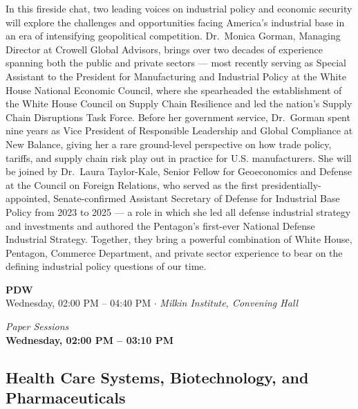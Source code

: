 \documentclass[
  10pt,
  letterpaper,
  DIV=11,
  numbers=noendperiod]{scrartcl}
\begin{document}
In this fireside chat, two leading voices on industrial policy and
economic security will explore the challenges and opportunities facing
America's industrial base in an era of intensifying geopolitical
competition. Dr.~Monica Gorman, Managing Director at Crowell Global
Advisors, brings over two decades of experience spanning both the public
and private sectors --- most recently serving as Special Assistant to
the President for Manufacturing and Industrial Policy at the White House
National Economic Council, where she spearheaded the establishment of
the White House Council on Supply Chain Resilience and led the nation's
Supply Chain Disruptions Task Force. Before her government service,
Dr.~Gorman spent nine years as Vice President of Responsible Leadership
and Global Compliance at New Balance, giving her a rare ground-level
perspective on how trade policy, tariffs, and supply chain risk play out
in practice for U.S. manufacturers. She will be joined by Dr.~Laura
Taylor-Kale, Senior Fellow for Geoeconomics and Defense at the Council
on Foreign Relations, who served as the first presidentially-appointed,
Senate-confirmed Assistant Secretary of Defense for Industrial Base
Policy from 2023 to 2025 --- a role in which she led all defense
industrial strategy and investments and authored the Pentagon's
first-ever National Defense Industrial Strategy. Together, they bring a
powerful combination of White House, Pentagon, Commerce Department, and
private sector experience to bear on the defining industrial policy
questions of our time.

\vspace{1em}


\begin{center}
\colorbox{event!15}{\parbox{0.9\linewidth}{\centering
  \textcolor{event}{\large\textbf{PDW}}\\[2pt]
  {\small Wednesday, 02:00 PM – 04:40 PM $\cdot$ \textit{Milkin Institute, Convening Hall}}
}}
\end{center}

\newpage


\begin{center}
\normalsize\textit{Paper Sessions}\\[0.3em]
\Large\textbf{Wednesday, 02:00 PM – 03:10 PM}
\end{center}

\subsection{\texorpdfstring{\textcolor{health}{Health Care Systems, Biotechnology, and Pharmaceuticals}}{}}\label{section-1}
\end{document}
